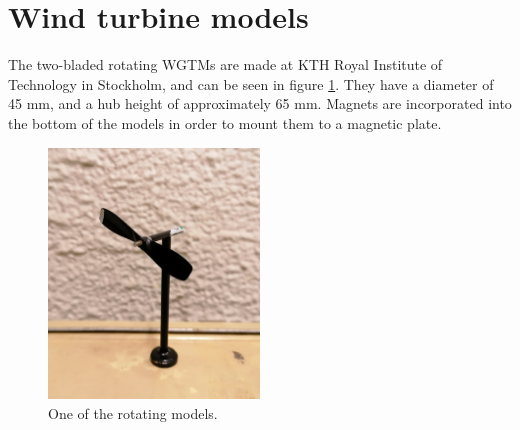 \section{Wind turbine models}
The two-bladed rotating \gls{WGTM}s are made at KTH Royal Institute of Technology in Stockholm, and can be seen in figure \ref{fig:rwtm}. They have a diameter of 45 \si{\mm}, and a hub height of approximately 65 \si{\mm}. Magnets are incorporated into the bottom of the models in order to mount them to a magnetic plate. 


\begin{figure} 
    \centering
    \includegraphics[width=0.5\textwidth]{0_Images/RWTM.jpg}    
    \caption[Rotating model.]{One of the rotating models.}
    \label{fig:rwtm}
\end{figure}

\FloatBarrier